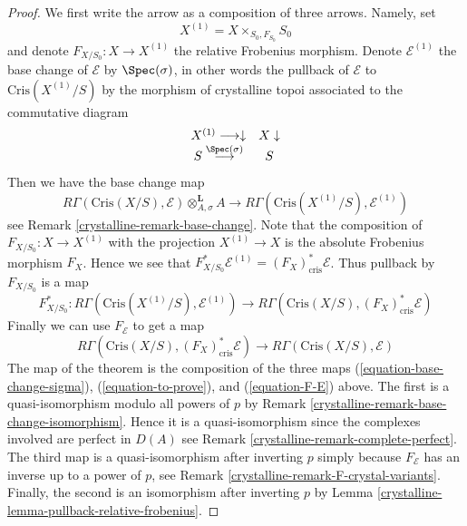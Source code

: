 \begin{proof}

We first write the arrow as a composition of three arrows.
Namely, set
$$
X^{(1)} = X \times_{S_0, F_{S_0}} S_0
$$
and denote $F_{X/S_0} : X \to X^{(1)}$ the relative Frobenius morphism.
Denote $\mathcal{E}^{(1)}$ the base change of $\mathcal{E}$
by $\Spec(\sigma)$, in other words the pullback of $\mathcal{E}$
to $\text{Cris}(X^{(1)}/S)$ by the morphism of crystalline topoi
associated to the commutative diagram
$$
\begin{array}{cc}X^{(1)} \longrightarrow\downarrow & X \downarrow \\ S \overset{\Spec(\sigma)}{\longrightarrow} & S\end{array}
$$
Then we have the base change map
\begin{equation}
\label{equation-base-change-sigma}
R\Gamma(\text{Cris}(X/S), \mathcal{E}) \otimes^\mathbf{L}_{A, \sigma} A
\longrightarrow
R\Gamma(\text{Cris}(X^{(1)}/S), \mathcal{E}^{(1)})
\end{equation}
see Remark \ref{crystalline-remark-base-change}. Note that the composition
of $F_{X/S_0} : X \to X^{(1)}$ with the projection $X^{(1)} \to X$
is the absolute Frobenius morphism $F_X$. Hence we see that
$F_{X/S_0}^*\mathcal{E}^{(1)} = (F_X)_{\text{cris}}^*\mathcal{E}$.
Thus pullback by $F_{X/S_0}$ is a map
\begin{equation}
\label{equation-to-prove}
F_{X/S_0}^* :
R\Gamma(\text{Cris}(X^{(1)}/S), \mathcal{E}^{(1)})
\longrightarrow
R\Gamma(\text{Cris}(X/S), (F_X)^*_{\text{cris}}\mathcal{E})
\end{equation}
Finally we can use $F_\mathcal{E}$ to get a map
\begin{equation}
\label{equation-F-E}
R\Gamma(\text{Cris}(X/S), (F_X)^*_{\text{cris}}\mathcal{E})
\longrightarrow
R\Gamma(\text{Cris}(X/S), \mathcal{E})
\end{equation}
The map of the theorem is the composition of the three maps
(\ref{equation-base-change-sigma}), (\ref{equation-to-prove}), and
(\ref{equation-F-E}) above. The first is a
quasi-isomorphism modulo all powers of $p$ by
Remark \ref{crystalline-remark-base-change-isomorphism}.
Hence it is a quasi-isomorphism since the complexes involved are perfect
in $D(A)$ see Remark \ref{crystalline-remark-complete-perfect}.
The third map is a quasi-isomorphism after inverting $p$ simply
because $F_\mathcal{E}$ has an inverse up to a power of $p$, see
Remark \ref{crystalline-remark-F-crystal-variants}.
Finally, the second is an isomorphism after inverting $p$
by Lemma \ref{crystalline-lemma-pullback-relative-frobenius}.
\end{proof}



